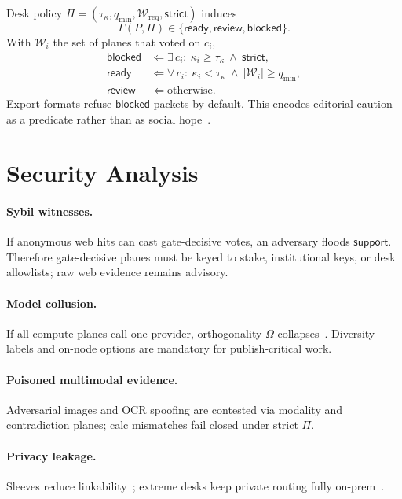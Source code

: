 \documentclass[journal,10pt,twocolumn,a4paper]{IEEEtran}
\begin{document}
Desk policy $\Pi=(\tau_\kappa,q_{\min},\mathcal{W}_{\mathrm{req}},\mathsf{strict})$ induces
\begin{equation}
\Gamma(P,\Pi)\in\{\mathsf{ready},\mathsf{review},\mathsf{blocked}\}.
\end{equation}
With $\mathcal{W}_i$ the set of planes that voted on $c_i$,
\begin{align}
\mathsf{blocked} &\Leftarrow \exists\,c_i:\ \kappa_i\ge\tau_\kappa\ \land\ \mathsf{strict},\\
\mathsf{ready} &\Leftarrow \forall\,c_i:\ \kappa_i<\tau_\kappa\ \land\ \lvert\mathcal{W}_i\rvert\ge q_{\min},\\
\mathsf{review} &\Leftarrow \text{otherwise}.
\end{align}
Export formats refuse $\mathsf{blocked}$ packets by default.
This encodes editorial caution as a predicate rather than as social hope~\cite{graves2017fact}.

\section{Security Analysis}
\label{sec:security}

\paragraph{Sybil witnesses.}
If anonymous web hits can cast gate-decisive votes, an adversary floods $\mathsf{support}$.
Therefore gate-decisive planes must be keyed to stake, institutional keys, or desk allowlists; raw web evidence remains advisory.

\paragraph{Model collusion.}
If all compute planes call one provider, orthogonality $\Omega$ collapses~\cite{bommasani2021foundation}.
Diversity labels and on-node options are mandatory for publish-critical work.

\paragraph{Poisoned multimodal evidence.}
Adversarial images and OCR spoofing are contested via modality and contradiction planes; calc mismatches fail closed under strict $\Pi$.

\paragraph{Privacy leakage.}
Sleeves reduce linkability~\cite{chaum1981mix}; extreme desks keep private routing fully on-prem~\cite{kairouz2021advances}.
\end{document}
